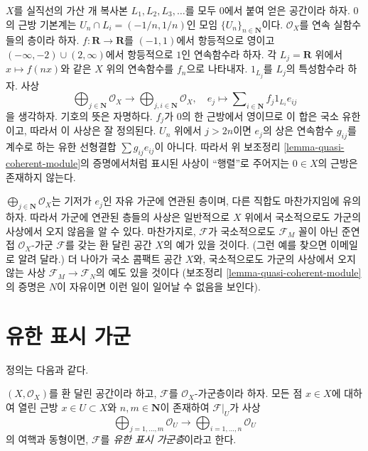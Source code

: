 \begin{example}
\label{example-quasi-coherent}
$X$를 실직선의 가산 개 복사본 $L_1, L_2, L_3, \ldots$를 모두
$0$에서 붙여 얻은 공간이라 하자. $0$의 근방 기본계는
$U_n \cap L_i = (-1/n, 1/n)$인 모임 $\{U_n\}_{n \in \mathbf{N}}$이다.
$\mathcal{O}_X$를 연속 실함수들의 층이라 하자.
$f : \mathbf{R} \to \mathbf{R}$를 $(-1, 1)$에서 항등적으로 영이고
$(-\infty, -2) \cup (2, \infty)$에서 항등적으로 $1$인 연속함수라 하자.
각 $L_j = \mathbf{R}$ 위에서 $x \mapsto f(nx)$와 같은
$X$ 위의 연속함수를 $f_n$으로 나타내자.
$1_{L_j}$를 $L_j$의 특성함수라 하자. 사상
$$
\bigoplus\nolimits_{j \in \mathbf{N}}
\mathcal{O}_X
\longrightarrow
\bigoplus\nolimits_{j, i \in \mathbf{N}}
\mathcal{O}_X, \quad
e_j \longmapsto \sum\nolimits_{i \in \mathbf{N}} f_j 1_{L_i} e_{ij}
$$
을 생각하자. 기호의 뜻은 자명하다. $f_j$가 $0$의 한 근방에서 영이므로
이 합은 국소 유한이고, 따라서 이 사상은 잘 정의된다.
$U_n$ 위에서 $j > 2n$이면 $e_j$의 상은 연속함수 $g_{ij}$를 계수로 하는
유한 선형결합 $\sum g_{ij} e_{ij}$이 아니다.
따라서 위 보조정리 \ref{lemma-quasi-coherent-module}의 증명에서처럼
표시된 사상이 “행렬”로 주어지는 $0 \in X$의 근방은 존재하지 않는다.

\medskip\noindent
$\bigoplus\nolimits_{j \in \mathbf{N}} \mathcal{O}_X$는 기저가 $e_j$인
자유 가군에 연관된 층이며, 다른 직합도 마찬가지임에 유의하자.
따라서 가군에 연관된 층들의 사상은 일반적으로 $X$ 위에서 국소적으로도
가군의 사상에서 오지 않음을 알 수 있다.
마찬가지로, $\mathcal{F}$가 국소적으로도 $\mathcal{F}_M$ 꼴이 아닌
준연접 $\mathcal{O}_X$-가군 $\mathcal{F}$를 갖는
환 달린 공간 $X$의 예가 있을 것이다.
(그런 예를 찾으면 이메일로 알려 달라.)
더 나아가 국소 콤팩트 공간 $X$와, 국소적으로도 가군의 사상에서 오지 않는
사상 $\mathcal{F}_M \to \mathcal{F}_N$의 예도 있을 것이다
(보조정리 \ref{lemma-quasi-coherent-module}의 증명은 $N$이 자유이면
이런 일이 일어날 수 없음을 보인다).
\end{example}












\section{유한 표시 가군}
\label{section-finite-presentation}

\noindent
정의는 다음과 같다.

\begin{definition}
\label{definition-finite-presentation}
$(X, \mathcal{O}_X)$를 환 달린 공간이라 하고,
$\mathcal{F}$를 $\mathcal{O}_X$-가군층이라 하자.
모든 점 $x \in X$에 대하여 열린 근방
$x\in U \subset X$와 $n, m \in \mathbf{N}$이 존재하여
$\mathcal{F}|_U$가 사상
$$
\bigoplus\nolimits_{j = 1, \ldots, m}
\mathcal{O}_U
\longrightarrow
\bigoplus\nolimits_{i = 1, \ldots, n}
\mathcal{O}_U
$$
의 여핵과 동형이면, $\mathcal{F}$를 {\it 유한 표시 가군층}이라고 한다.
\end{definition}


